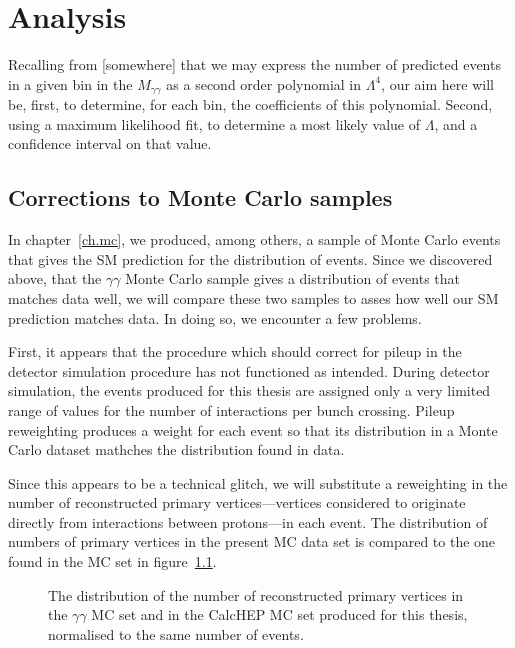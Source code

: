 \chapter{Analysis}\label{ch.an}

Recalling from [somewhere] that we may express the number of predicted events in a given bin in the $M_{\gamma\gamma}$ as a second order polynomial in $\Lambda^4$, our aim here will be, first, to determine, for each bin, the coefficients of this polynomial. Second, using a maximum likelihood fit, to determine a most likely value of $\Lambda$, and a confidence interval on that value.

\section{Corrections to Monte Carlo samples}

In chapter~\ref{ch.mc}, we produced, among others, a sample of Monte Carlo events that gives the SM prediction for the distribution of events. Since we discovered above, that the \atlas{} $\gamma\gamma$ Monte Carlo sample gives a distribution of events that matches data well, we will compare these two samples to asses how well our SM prediction matches data. In doing so, we encounter a few problems.

First, it appears that the procedure which should correct for pileup in the detector simulation procedure has not functioned as intended. During detector simulation, the events produced for this thesis are assigned only a very limited range of values for the number of interactions per bunch crossing. Pileup reweighting produces a weight for each event so that its distribution in a Monte Carlo dataset mathches the distribution found in data.

Since this appears to be a technical glitch, we will substitute a reweighting in the number of reconstructed primary vertices---vertices considered to originate directly from interactions between protons---in each event. The distribution of numbers of primary vertices in the present MC data set is compared to the one found in the \atlas{} MC set in figure~\ref{pvnnone}.

\begin{figure}[htp]
\begin{minipage}[b]{.69\textwidth}
\begin{infilsf} \tiny

\end{infilsf}
\end{minipage}
\begin{minipage}[b]{.3\textwidth}
\caption{The distribution of the number of reconstructed primary vertices in the \atlas{} $\gamma\gamma$ MC set and in the CalcHEP MC set produced for this thesis, normalised to the same number of events.}\label{pvnnone}
\end{minipage}
\end{figure}


